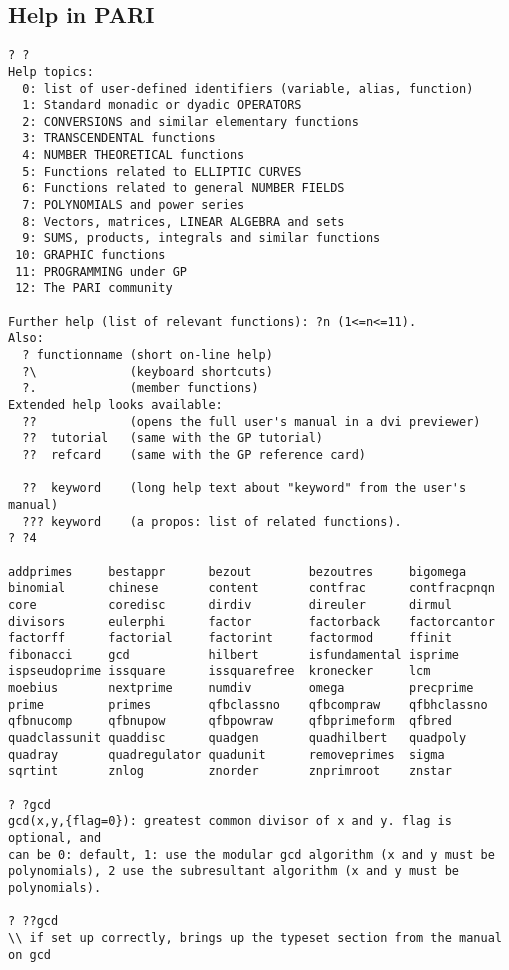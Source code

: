 \documentclass[11pt]{report}
\begin{document}
\subsection{Help in PARI}
\begin{verbatim}
? ?
Help topics:
  0: list of user-defined identifiers (variable, alias, function)
  1: Standard monadic or dyadic OPERATORS
  2: CONVERSIONS and similar elementary functions
  3: TRANSCENDENTAL functions
  4: NUMBER THEORETICAL functions
  5: Functions related to ELLIPTIC CURVES
  6: Functions related to general NUMBER FIELDS
  7: POLYNOMIALS and power series
  8: Vectors, matrices, LINEAR ALGEBRA and sets
  9: SUMS, products, integrals and similar functions
 10: GRAPHIC functions
 11: PROGRAMMING under GP
 12: The PARI community

Further help (list of relevant functions): ?n (1<=n<=11).
Also:
  ? functionname (short on-line help)
  ?\             (keyboard shortcuts)
  ?.             (member functions)
Extended help looks available:
  ??             (opens the full user's manual in a dvi previewer)
  ??  tutorial   (same with the GP tutorial)
  ??  refcard    (same with the GP reference card)

  ??  keyword    (long help text about "keyword" from the user's manual)
  ??? keyword    (a propos: list of related functions).
? ?4

addprimes     bestappr      bezout        bezoutres     bigomega
binomial      chinese       content       contfrac      contfracpnqn
core          coredisc      dirdiv        direuler      dirmul
divisors      eulerphi      factor        factorback    factorcantor
factorff      factorial     factorint     factormod     ffinit
fibonacci     gcd           hilbert       isfundamental isprime
ispseudoprime issquare      issquarefree  kronecker     lcm
moebius       nextprime     numdiv        omega         precprime
prime         primes        qfbclassno    qfbcompraw    qfbhclassno
qfbnucomp     qfbnupow      qfbpowraw     qfbprimeform  qfbred
quadclassunit quaddisc      quadgen       quadhilbert   quadpoly
quadray       quadregulator quadunit      removeprimes  sigma
sqrtint       znlog         znorder       znprimroot    znstar

? ?gcd
gcd(x,y,{flag=0}): greatest common divisor of x and y. flag is optional, and 
can be 0: default, 1: use the modular gcd algorithm (x and y must be 
polynomials), 2 use the subresultant algorithm (x and y must be polynomials).

? ??gcd
\\ if set up correctly, brings up the typeset section from the manual on gcd
\end{verbatim}
\end{document}
